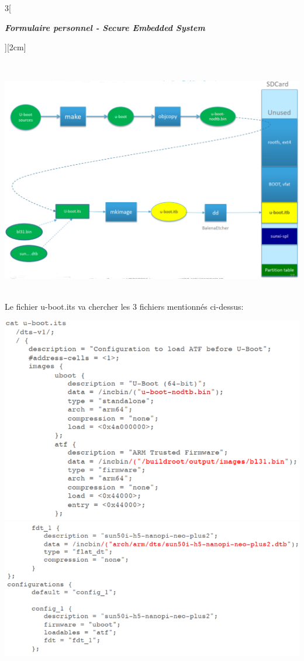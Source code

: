 \begin{multicols}{3}[\centerline{ \large\em \textbf{Formulaire personnel - Secure Embedded System}}][2cm]
\begin{minipage}{\linewidth}
\end{minipage}\\
\begin{minipage}{\linewidth}
	\centering
    \includegraphics[width =0.8\columnwidth]{images/16.png}
\end{minipage}\\
Le fichier u-boot.its va chercher les 3 fichiers mentionnés ci-dessus:\\
\begin{minipage}{\linewidth}
	\centering
    \includegraphics[width =0.8\columnwidth]{images/14.png}
    \includegraphics[width =0.8\columnwidth]{images/15.png}
\end{minipage}

\end{multicols}
